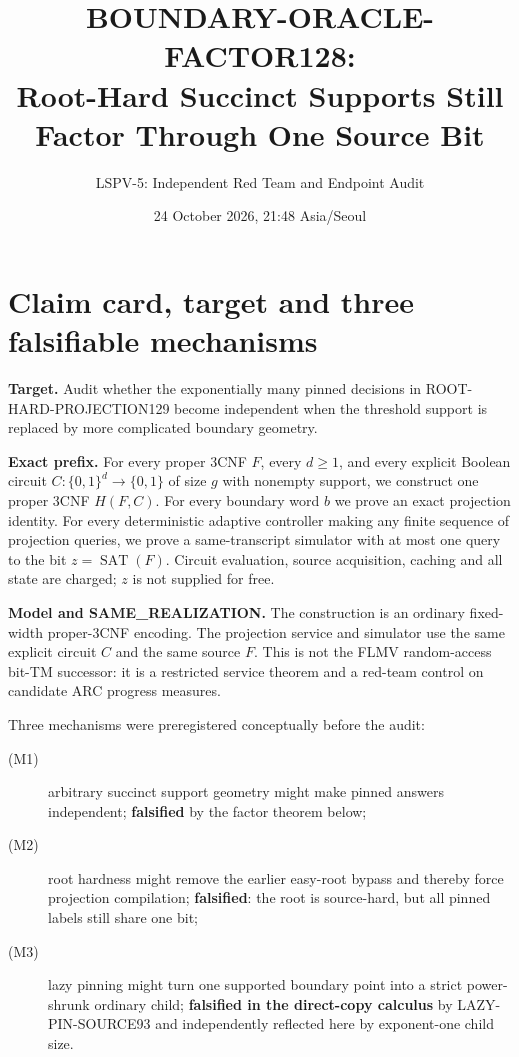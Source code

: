 \documentclass[11pt]{article}
\title{BOUNDARY-ORACLE-FACTOR128:\\Root-Hard Succinct Supports Still Factor Through One Source Bit}
\author{LSPV-5: Independent Red Team and Endpoint Audit}
\date{24 October 2026, 21:48 Asia/Seoul}
\newcommand{\SAT}{\operatorname{SAT}}
\begin{document}
\maketitle
\begin{center}
\end{center}

\section{Claim card, target and three falsifiable mechanisms}
\textbf{Target.}  Audit whether the exponentially many pinned decisions in
ROOT-HARD-PROJECTION129 become independent when the threshold support is
replaced by more complicated boundary geometry.

\textbf{Exact prefix.}  For every proper 3CNF $F$, every $d\ge1$, and every
explicit Boolean circuit $C:\{0,1\}^d\to\{0,1\}$ of size $g$ with nonempty
support, we construct one proper 3CNF $H(F,C)$.  For every boundary word $b$
we prove an exact projection identity.  For every deterministic adaptive
controller making any finite sequence of projection queries, we prove a
same-transcript simulator with at most one query to the bit $z=\SAT(F)$.
Circuit evaluation, source acquisition, caching and all state are charged;
$z$ is not supplied for free.

\textbf{Model and SAME\_REALIZATION.}  The construction is an ordinary
fixed-width proper-3CNF encoding.  The projection service and simulator use
the same explicit circuit $C$ and the same source $F$.  This is not the FLMV
random-access bit-TM successor: it is a restricted service theorem and a
red-team control on candidate ARC progress measures.

Three mechanisms were preregistered conceptually before the audit:
\begin{description}
\item[(M1)] arbitrary succinct support geometry might make pinned answers
independent; \textbf{falsified} by the factor theorem below;
\item[(M2)] root hardness might remove the earlier easy-root bypass and thereby
force projection compilation; \textbf{falsified}: the root is source-hard, but
all pinned labels still share one bit;
\item[(M3)] lazy pinning might turn one supported boundary point into a strict
power-shrunk ordinary child; \textbf{falsified in the direct-copy calculus} by
LAZY-PIN-SOURCE93 and independently reflected here by exponent-one child size.
\end{description}
\end{document}
